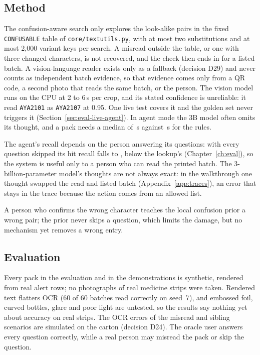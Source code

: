 \subsection{Method}
The confusion-aware search only explores the look-alike pairs in the fixed \texttt{CONFUSABLE} table of \texttt{core/textutils.py}, with at most two substitutions and at most 2,000 variant keys per search. A misread outside the table, or one with three changed characters, is not recovered, and the check then ends in \NLISTED{} for a listed batch. A vision-language reader exists only as a fallback (decision D29) and never counts as independent batch evidence, so that evidence comes only from a QR code, a second photo that reads the same batch, or the person. The vision model runs on the CPU at 2 to 6\,s per crop, and its stated confidence is unreliable: it read \texttt{AYA2101} as \texttt{AYA2107} at 0.95. One live test covers it and the golden set never triggers it (Section~\ref{sec:eval-live-agent}). In agent mode the 3B model often omits its thought, and a pack needs a median of \,s against \,s for the rules.

The agent's recall depends on the person answering its questions: with every question skipped its hit recall falls to , below the lookup's  (Chapter~\ref{ch:eval}), so the system is useful only to a person who can read the printed batch. The 3-billion-parameter model's thoughts are not always exact: in the walkthrough one thought swapped the read and listed batch (Appendix~\ref{app:traces}), an error that stays in the trace because the action comes from an allowed list.

A person who confirms the wrong character teaches the local confusion prior a wrong pair; the prior never skips a question, which limits the damage, but no mechanism yet removes a wrong entry.

\subsection{Evaluation}
Every pack in the evaluation and in the demonstrations is synthetic, rendered from real alert rows; no photographs of real medicine strips were taken. Rendered text flatters OCR (60 of 60 batches read correctly on seed~7), and embossed foil, curved bottles, glare and poor light are untested, so the results say nothing yet about accuracy on real strips. The OCR errors of the misread and sibling scenarios are simulated on the carton (decision D24). The oracle user answers every question correctly, while a real person may misread the pack or skip the question.

